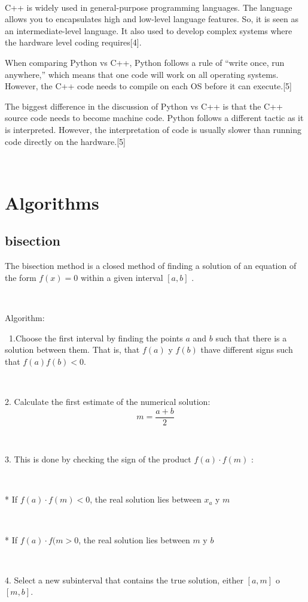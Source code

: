 \documentclass[conference]{IEEEtran}
\begin{document}
\

C++ is widely used in general-purpose programming languages. The language allows you to encapsulates high and low-level language features. So, it is seen as an intermediate-level language. It also used to develop complex systems where the hardware level coding requires[4].


When comparing Python vs C++, Python follows a rule of “write once, run anywhere,” which means that one code will work on all operating systems. However, the C++ code needs to compile on each OS before it can execute.[5]

The biggest difference in the discussion of Python vs C++ is that the C++ source code needs to become machine code. Python follows a different tactic as it is interpreted. However, the interpretation of code is usually slower than running code directly on the hardware.[5]


\

\section{Algorithms}


\subsection{bisection}
The bisection method is a closed method of finding a solution of an equation of the form $ f(x) = 0 $ within a given interval $ [a, b] $ .

\


Algorithm:

\
1.Choose the first interval by finding the points $ a $ and $ b $ such that there is a solution between them. That is, that $ f(a) $ y $ f(b) $ thave different signs such that $ f(a) f(b) < 0 $.

\

2. Calculate the first estimate of the numerical solution: $$ m = \frac{a+b}{2} $$

\

3. This is done by checking the sign of the product $ f(a) \cdot f(m) $ :

\

    * If $ f(a) \cdot f(m) < 0 $, the real solution lies between $ x_{a} $ y $ m $

 \

    * If $ f(a) \cdot f(m > 0 $, the real solution lies between $ m $ y $ b $

\

4. Select a new subinterval that contains the true solution, either $ [a, m] $ o $ [m, b] $.
\end{document}
